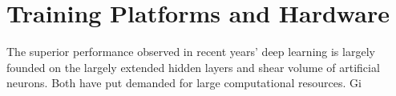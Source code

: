 \section{Training Platforms and Hardware}
The superior performance observed in recent years' deep learning is largely founded on the largely extended hidden layers and shear volume of artificial neurons. Both have put demanded for large computational resources. Gi